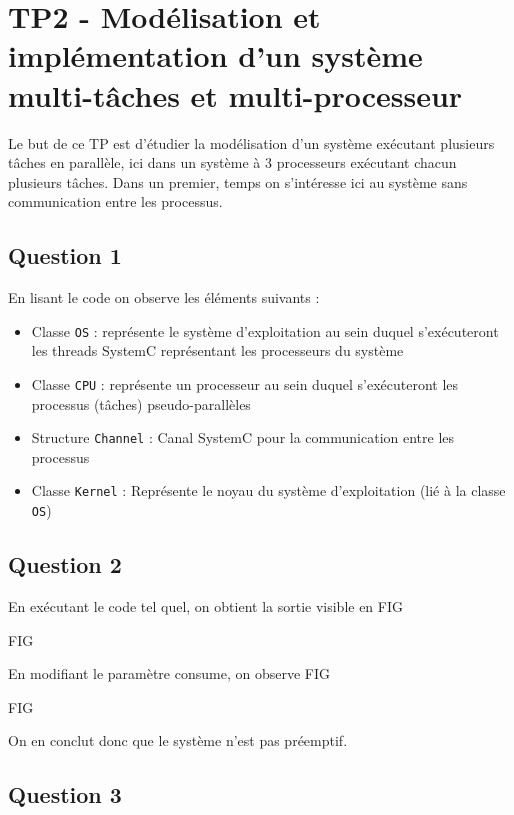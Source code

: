 \documentclass[
    letterpaper, %
    10pt, %
]{CSUniSchoolLabReport}
\begin{document}
\pagebreak
\section{TP2 - Modélisation et implémentation d'un système multi-tâches et multi-processeur}

Le but de ce TP est d'étudier la modélisation d'un système exécutant plusieurs
tâches en parallèle, ici dans un système à 3 processeurs exécutant chacun
plusieurs tâches. Dans un premier, temps on s'intéresse ici au système sans
communication entre les processus.

\subsection{Question 1}

En lisant le code on observe les éléments suivants :

\begin{itemize}
    \item Classe \texttt{OS} : représente le système d'exploitation au sein
    duquel s'exécuteront les threads SystemC représentant les processeurs du
    système
    \item Classe \texttt{CPU} : représente un processeur au sein duquel
    s'exécuteront les processus (tâches) pseudo-parallèles
    \item Structure \texttt{Channel} : Canal SystemC pour la communication entre
    les processus
    \item Classe \texttt{Kernel} : Représente le noyau du système d'exploitation
    (lié à la classe \texttt{OS})
\end{itemize}

\subsection{Question 2}

En exécutant le code tel quel, on obtient la sortie visible en FIG

FIG

En modifiant le paramètre consume, on observe FIG 

FIG 

On en conclut donc que le système n'est pas préemptif.

\subsection{Question 3}
\end{document}
